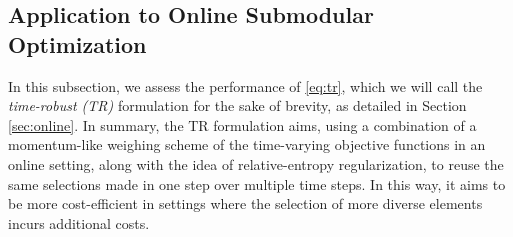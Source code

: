 \documentclass[letter,11pt]{article}
\begin{document}
\subsection{Application to Online Submodular Optimization}\label{subsec:online}
In this subsection, we assess the performance of \eqref{eq:tr}, which we will call the \textit{time-robust (TR)} formulation for the sake of brevity, as detailed in Section \ref{sec:online}. In summary, the TR formulation aims, using a combination of a momentum-like weighing scheme of the time-varying objective functions in an online setting, along with the idea of relative-entropy regularization, to reuse the same selections made in one step over multiple time steps. In this way, it aims to be more cost-efficient in settings where the selection of more diverse elements incurs additional costs. 
\end{document}
